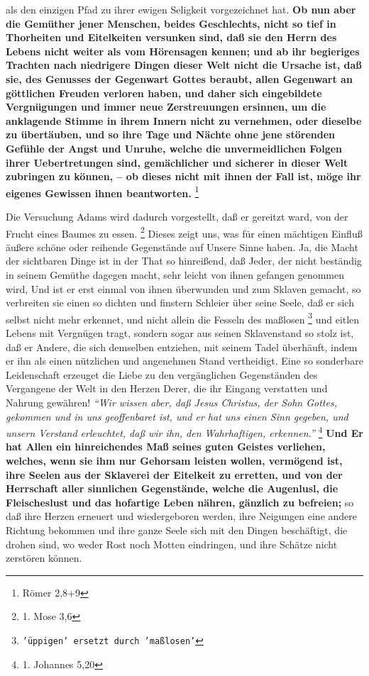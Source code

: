{als den einzigen Pfad zu ihrer ewigen Seligkeit vorgezeichnet hat. \textbf{Ob
nun aber
die Gemüther jener Menschen, beides Geschlechts, nicht so tief in Thorheiten und
Eitelkeiten versunken sind, daß sie den Herrn des Lebens nicht weiter als vom
Hörensagen kennen; und ab ihr begieriges Trachten nach niedrigere Dingen dieser
Welt nicht die Ursache ist, daß sie, des Genusses der Gegenwart Gottes beraubt,
allen Gegenwart an göttlichen Freuden verloren haben, und daher sich
eingebildete Vergnügungen und immer neue Zerstreuungen ersinnen, um die
anklagende Stimme in ihrem Innern nicht zu vernehmen, oder dieselbe zu
übertäuben, und so ihre Tage und Nächte ohne jene störenden Gefühle der Angst
und Unruhe, welche die unvermeidlichen Folgen ihrer Uebertretungen sind,
gemächlicher und sicherer in dieser Welt zubringen zu können, -- ob dieses nicht
mit ihnen der Fall ist, möge ihr eigenes Gewissen ihnen
beantworten.}
\footnote{Römer 2,8+9}

\medskip

Die Versuchung Adams wird dadurch vorgestellt, daß er gereitzt ward, von der
Frucht eines Baumes zu essen.
\footnote{1. Mose 3,6}
Dieses zeigt uns, was für
einen mächtigen Einfluß äußere schöne oder reihende Gegenstände auf Unsere Sinne
haben. Ja, die Macht der sichtbaren Dinge ist in der That so hinreißend, daß
Jeder, der nicht beständig in seinem Gemüthe dagegen macht, sehr leicht von
ihnen gefangen genommen wird, Und ist er erst einmal von ihnen überwunden und
zum Sklaven gemacht, so verbreiten sie einen so dichten
und finstern Schleier
über seine Seele, daß er sich selbst nicht mehr erkennet, und nicht allein die
Fesseln des maßlosen
\footnote{\texttt{'üppigen' ersetzt durch 'maßlosen'}} und eitlen Lebens mit
Vergnügen tragt, sondern sogar aus
seinen Sklavenstand so stolz ist, daß er Andere, die sich
demselben entziehen,
mit seinem Tadel überhäuft, indem er ihn als einen nützlichen und angenehmen
Stand vertheidigt. Eine so sonderbare Leidenschaft erzeuget die Liebe zu den
vergänglichen Gegenständen des Vergangene der Welt in den Herzen Derer, die ihr
Eingang verstatten und Nahrung gewähren!
\textit{"`Wir wissen aber, daß Jesus Christus,
der Sohn Gottes, gekommen und in uns geoffenbaret ist, und er hat uns einen Sinn
gegeben, und unsern Verstand erleuchtet, daß wir ihn, den Wahrhaftigen,
erkennen."'}
\footnote{1. Johannes 5,20}
\textbf{Und Er hat Allen ein hinreichendes Maß seines
guten Geistes verliehen, welches, wenn sie ihm nur Gehorsam leisten wollen,
vermögend ist, ihre Seelen aus der Sklaverei der Eitelkeit zu erretten, und von
der Herrschaft aller sinnlichen Gegenstände, welche die Augenlusl, die
Fleischeslust und das hofartige Leben nähren, gänzlich zu befreien;} so daß ihre
Herzen erneuert und wiedergeboren werden, ihre Neigungen
eine andere Richtung
bekommen und ihre ganze Seele sich mit den Dingen beschäftigt, die drohen sind,
wo weder Rost noch Motten eindringen, und ihre Schätze nicht zerstören können.

}
